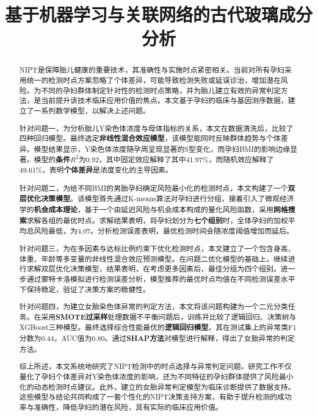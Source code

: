 \documentclass[withoutpreface,bwprint]{cumcmthesis} %
\title{基于机器学习与关联网络的古代玻璃成分分析}
\begin{document}
\maketitle

\begin{abstract}

NIPT是保障胎儿健康的重要技术，其准确性与实施时点紧密相关。当前对所有孕妇采用统一的检测时点方案忽略了个体差异，可能导致检测失败或延误诊治，增加潜在风险。为不同的孕妇群体制定针对性的检测时点策略，并为胎儿建立有效的异常判定方法，是当前提升该技术临床应用价值的焦点。本文基于孕妇的临床与基因测序数据，建立了一系列数学模型，以解决上述问题。

针对问题一，为分析胎儿Y染色体浓度与母体指标的关系，本文在数据清洗后，比较了四种回归模型。最终选定\textbf{非线性混合效应模型}，该模型能同时反映群体趋势与个体差异。模型结果显示，Y染色体浓度随孕周呈现显著的S型变化，而孕妇BMI的影响边缘显著。模型的\textbf{条件$R^2$}为0.92，其中固定效应解释了其中41.97\%，而随机效应解释了49.61\%，表明\textbf{个体差异}是浓度变化的主导因素。

针对问题二，为给不同BMI的男胎孕妇确定风险最小化的检测时点，本文构建了一个\textbf{双层优化决策模型}。该模型首先通过K-means算法对孕妇进行分组，接着引入了微观经济学的\textbf{机会成本理论}，基于一个由延迟风险与机会成本构成的量化风险函数，采用\textbf{网格搜索}求解各组的最优时点。求解结果表明，将孕妇划分为\textbf{七个组别}时，全体孕妇的加权平均总风险最低，为4.07。分析检测误差表明，最优检测时间会随浓度阈值增加而延后。

针对问题三，为在多因素与达标比例约束下优化检测时点，本文建立了一个包含身高、体重、年龄等多变量的非线性混合效应预测模型。在问题二优化模型的基础上，继续进行求解双层优化决策模型，结果表明，在考虑更多因素后，最佳分组为四个组别。进一步通过蒙特卡洛模拟进行检测误差分析，模型推荐的最优时点均值在不同检测误差水平下保持稳定，验证了决策方案的稳健性。

针对问题四，为建立女胎染色体异常的判定方法，本文将该问题构建为一个二元分类任务。在采用\textbf{SMOTE过采样}处理数据不平衡问题后，训练并比较了逻辑回归、决策树与XGBoost三种模型。最终选择综合性能最优的\textbf{逻辑回归模型}，其在测试集上的异常类F1分数为0.44，AUC值为0.80。通过\textbf{SHAP方法}对模型进行解释，得出了女胎异常的判定方法。

综上所述，本文系统地研究了NIPT检测中的时点选择与异常判定问题。研究工作不仅量化了孕妇个体差异对Y染色体浓度的影响，还为不同特征的孕妇群体提供了风险最小化的动态检测时点建议。此外，建立的女胎异常判定模型为临床诊断提供了数据支持。这些模型与结论共同构成了一套个性化的NIPT决策支持方案，有助于提升检测的成功率与准确性，降低孕妇的潜在风险，具有实际的临床应用价值。



\end{abstract}










\newpage




\newpage
\end{document}

